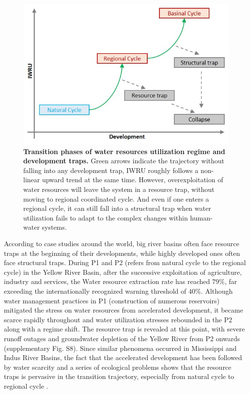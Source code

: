 \documentclass[9pt, twocolumn, twoside, lineno]{pnas-new}
\begin{document}
\begin{figure}%
	\centering
	\includegraphics[width=\linewidth]{../../figures/main_text/traps.jpg}
	\caption{
		\textbf{Transition phases of water resources utilization regime and development traps.}
		Green arrows indicate the trajectory without falling into any development trap, IWRU roughly follows a non-linear upward trend at the same time. However, overexploitation of water resources will leave the system in a resource trap, without moving to regional coordinated cycle. And even if one enters a regional cycle, it can still fall into a structural trap when water utilization fails to adapt to the complex changes within human-water systems.
	}
	\label{fig:traps}
\end{figure}

According to case studies around the world, big river basins often face resource traps at the beginning of their developments, while highly developed ones often face structural traps.
During P1 and P2 (refers from natural cycle to the regional cycle) in the Yellow River Basin, after the successive exploitation of agriculture, industry and services, the Water resource extraction rate has reached $79\%$, far exceeding the internationally recognized warning threshold of $40\%$. Although water management practices in P1 (construction of numerous reservoirs) mitigated the stress on water resources from accelerated development, it became scarce rapidly throughout and water utilization stresses rebounded in the P2 along with a regime shift. The resource trap is revealed at this point, with severe runoff outages and groundwater depletion of the Yellow River from P2 onwards (supplementary Fig. S8).
Since similar phenomena occurred in Mississippi and Indus River Basins, the fact that the accelerated development has been followed by water scarcity and a series of ecological problems shows that the resource traps is pervasive in the transition trajectory, especially from natural cycle to regional cycle 
\cite{bestAnthropogenicStressesWorld2019,cummingResilienceBigRiver2011}.
\end{document}
